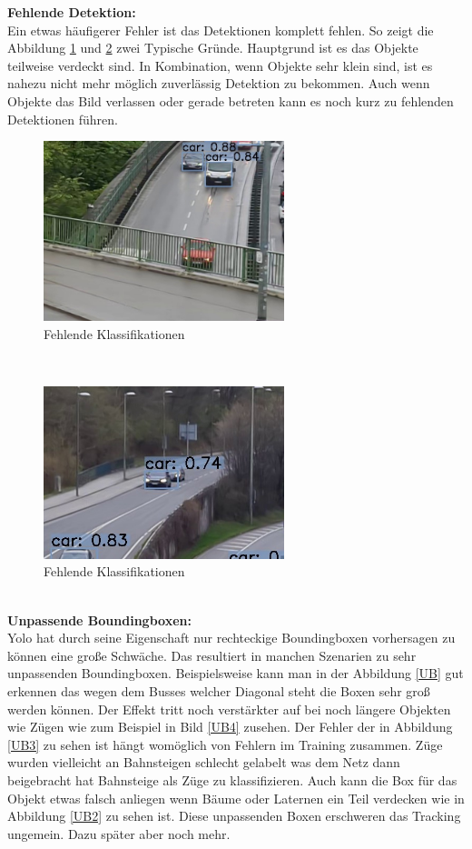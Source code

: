 \documentclass[conference]{IEEEtran}
\begin{document}
	\textbf{Fehlende Detektion:}\\
	Ein etwas häufigerer Fehler ist das Detektionen komplett fehlen. So zeigt die Abbildung \ref{FeK} und \ref{FeK2} zwei Typische Gründe. Hauptgrund ist es das Objekte teilweise verdeckt sind. In Kombination, wenn Objekte sehr klein sind, ist es nahezu nicht mehr möglich zuverlässig Detektion zu bekommen. Auch wenn Objekte das Bild verlassen oder gerade betreten kann es noch kurz zu fehlenden Detektionen führen.
	\begin{figure}[!h]
		\begin{center}
			\includegraphics[width=7cm]{Media/Output_680 - Kopie.jpg}
			\caption{Fehlende Klassifikationen}
			\label{FeK}
		\end{center}
	\end{figure}\\
	\begin{figure}[!h]
		\begin{center}
			\includegraphics[width=7cm]{Media/Output_108 - Kopie.jpg}
			\caption{Fehlende Klassifikationen}
			\label{FeK2}
		\end{center}
	\end{figure}\\
	\textbf{Unpassende Boundingboxen:}\\
	Yolo hat durch seine Eigenschaft nur rechteckige Boundingboxen vorhersagen zu können eine große Schwäche. Das resultiert in manchen Szenarien zu sehr unpassenden Boundingboxen. Beispielsweise kann man in der Abbildung \ref{UB} gut erkennen das wegen dem Busses welcher Diagonal steht die Boxen sehr groß werden können. Der Effekt tritt noch verstärkter auf bei noch längere Objekten wie Zügen wie zum Beispiel in Bild \ref{UB4} zusehen. Der Fehler der in Abbildung \ref{UB3} zu sehen ist hängt womöglich von Fehlern im Training zusammen. Züge wurden vielleicht an Bahnsteigen schlecht gelabelt was dem Netz dann beigebracht hat Bahnsteige als Züge zu klassifizieren. Auch kann die Box für das Objekt etwas falsch anliegen wenn Bäume oder Laternen ein Teil verdecken wie in Abbildung \ref{UB2} zu sehen ist. Diese unpassenden Boxen erschweren das Tracking ungemein. Dazu später aber noch mehr. 
\end{document}
